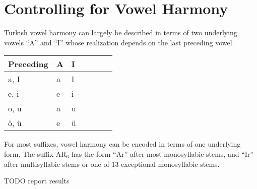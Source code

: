\documentclass[11pt,letterpaper]{article}
\begin{document}
\section{Controlling for Vowel Harmony}\label{sec:vowel-harmony}



Turkish vowel harmony can largely be described in terms of two underlying vowels ``A'' and ``I'' whose realization depends on the last preceding vowel.



    \begin{tabular}{l|llllll}
        Preceding & A & I \\ \hline
        a, I & a & I \\
        e, i & e & i \\
        o, u & a & u \\
        {\"o}, {\"u} & e & {\"u}
    \end{tabular}
    
For most suffixes, vowel harmony can be encoded in terms of one underlying form.
The suffix AR$_6$ has the form ``Ar'' after most monosyllabic stems, and ``Ir'' after multisyllabic stems or one of 13 exceptional monosyllabic stems.

TODO report results



\end{document}
